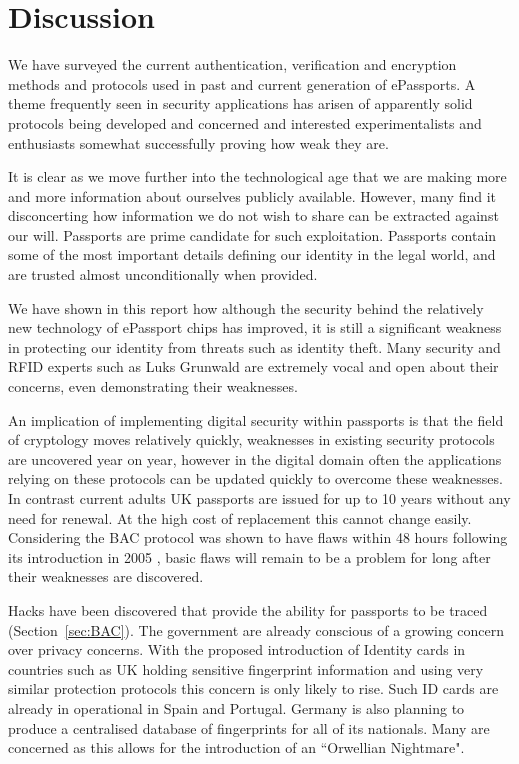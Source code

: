 \documentclass[12pt]{article}
\begin{document}
\section{Discussion}
We have surveyed the current authentication, verification and encryption methods and protocols used in past and current generation of ePassports. 
A theme frequently seen in security applications has arisen of apparently solid protocols being developed and concerned and interested experimentalists and enthusiasts somewhat successfully proving how weak they are.

It is clear as we move further into the technological age that we are making more and more information about ourselves publicly available. However, many find it disconcerting how information we do not wish to share can be extracted against our will. Passports are prime candidate for such exploitation. Passports contain some of the most important details defining our identity in the legal world, and are trusted almost unconditionally when provided. 

We have shown in this report how although the security behind the relatively new technology of ePassport chips has improved, it is still a significant weakness in protecting our identity from threats such as identity theft. Many security and RFID experts such as Luks Grunwald are extremely vocal and open about their concerns, even demonstrating their weaknesses. 

An implication of implementing digital security within passports is that the field of cryptology moves relatively quickly, weaknesses in existing security protocols are uncovered year on year, however in the digital domain often the applications relying on these protocols can be updated quickly to overcome these weaknesses. In contrast current adults UK passports are issued for up to 10 years without any need for renewal. At the high cost of replacement this cannot change easily. Considering the BAC protocol was shown to have flaws within 48 hours following its introduction in 2005 \cite{Crackedit:wc}, basic flaws will remain to be a problem for long after their weaknesses are discovered. 

Hacks have been discovered that provide the ability for passports to be traced (Section~\ref{sec:BAC}). The government are already conscious of a growing concern over privacy concerns. With the proposed introduction of Identity cards in countries such as UK \cite{JRC:2008ws} holding sensitive fingerprint information and using very similar protection protocols this concern is only likely to rise. Such ID cards are already in operational in Spain and Portugal. Germany is also planning to produce a centralised database of fingerprints for all of its nationals. Many are concerned as this allows for the introduction of an ``Orwellian Nightmare".
\end{document}
